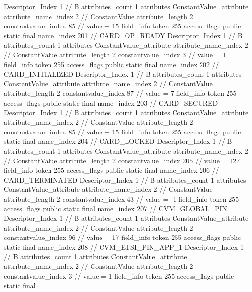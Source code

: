 {{{{{				Descriptor_Index	1		// B
				attributes_count	1
				attributes {
				ConstantValue_attribute {
					attribute_name_index	2		// ConstantValue
					attribute_length	2
					constantvalue_index	85		// value = 15
				}
				}
			}
			field_info {
				token	255
				access_flags	public static final
				name_index	201		// CARD_OP_READY
				Descriptor_Index	1		// B
				attributes_count	1
				attributes {
				ConstantValue_attribute {
					attribute_name_index	2		// ConstantValue
					attribute_length	2
					constantvalue_index	3		// value = 1
				}
				}
			}
			field_info {
				token	255
				access_flags	public static final
				name_index	202		// CARD_INITIALIZED
				Descriptor_Index	1		// B
				attributes_count	1
				attributes {
				ConstantValue_attribute {
					attribute_name_index	2		// ConstantValue
					attribute_length	2
					constantvalue_index	87		// value = 7
				}
				}
			}
			field_info {
				token	255
				access_flags	public static final
				name_index	203		// CARD_SECURED
				Descriptor_Index	1		// B
				attributes_count	1
				attributes {
				ConstantValue_attribute {
					attribute_name_index	2		// ConstantValue
					attribute_length	2
					constantvalue_index	85		// value = 15
				}
				}
			}
			field_info {
				token	255
				access_flags	public static final
				name_index	204		// CARD_LOCKED
				Descriptor_Index	1		// B
				attributes_count	1
				attributes {
				ConstantValue_attribute {
					attribute_name_index	2		// ConstantValue
					attribute_length	2
					constantvalue_index	205		// value = 127
				}
				}
			}
			field_info {
				token	255
				access_flags	public static final
				name_index	206		// CARD_TERMINATED
				Descriptor_Index	1		// B
				attributes_count	1
				attributes {
				ConstantValue_attribute {
					attribute_name_index	2		// ConstantValue
					attribute_length	2
					constantvalue_index	43		// value = -1
				}
				}
			}
			field_info {
				token	255
				access_flags	public static final
				name_index	207		// CVM_GLOBAL_PIN
				Descriptor_Index	1		// B
				attributes_count	1
				attributes {
				ConstantValue_attribute {
					attribute_name_index	2		// ConstantValue
					attribute_length	2
					constantvalue_index	96		// value = 17
				}
				}
			}
			field_info {
				token	255
				access_flags	public static final
				name_index	208		// CVM_ETSI_PIN_APP_1
				Descriptor_Index	1		// B
				attributes_count	1
				attributes {
				ConstantValue_attribute {
					attribute_name_index	2		// ConstantValue
					attribute_length	2
					constantvalue_index	3		// value = 1
				}
				}
			}
			field_info {
				token	255
				access_flags	public static final
}}}}}
